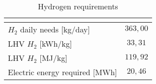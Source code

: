 \begin{table}[H]
\centering
\begin{tabular}{|lc|}
\hline
\multicolumn{2}{|c|}{\cellcolor{bluepoli!40}{\textbf{Hydrogen Requirements}}} \\ \hline
\multicolumn{1}{|l|}{$H_2$ daily needs {[}kg/day{]}}     & $363,00$           \\ \hline
\multicolumn{1}{|l|}{LHV $H_2$ {[}kWh/kg{]}}             & $33,31$            \\ \hline
\multicolumn{1}{|l|}{LHV $H_2$ {[}MJ/kg{]}}              & $119,92$           \\ \hline
\multicolumn{1}{|l|}{Electric energy required {[}MWh{]}} & $20,46$            \\ \hline
\end{tabular}
\caption{Hydrogen requirements}
\label{tab:hydrogenrequirements}
\end{table}